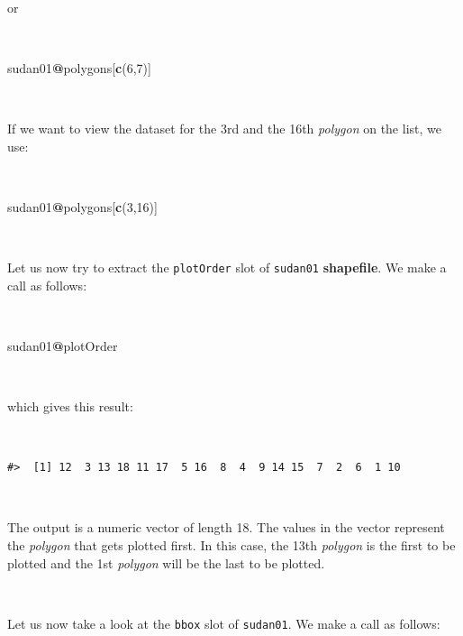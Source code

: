 \documentclass[12pt,a4paper,a4paper]{book}
\newenvironment{Shaded}{\begin{snugshade}}{\end{snugshade}}
\newcommand{\KeywordTok}[1]{\textcolor[rgb]{0.13,0.29,0.53}{\textbf{#1}}}
\newcommand{\DecValTok}[1]{\textcolor[rgb]{0.00,0.00,0.81}{#1}}
\newcommand{\OperatorTok}[1]{\textcolor[rgb]{0.81,0.36,0.00}{\textbf{#1}}}
\newcommand{\NormalTok}[1]{#1}
\theoremstyle{definition}
\theoremstyle{definition}
\theoremstyle{definition}
\theoremstyle{remark}
\begin{document}
~

or

~

\begin{Shaded}
\begin{Highlighting}[]
\NormalTok{sudan01}\OperatorTok{@}\NormalTok{polygons[}\KeywordTok{c}\NormalTok{(}\DecValTok{6}\NormalTok{,}\DecValTok{7}\NormalTok{)]}
\end{Highlighting}
\end{Shaded}

~

If we want to view the dataset for the 3rd and the 16th \emph{polygon}
on the list, we use:

~

\begin{Shaded}
\begin{Highlighting}[]
\NormalTok{sudan01}\OperatorTok{@}\NormalTok{polygons[}\KeywordTok{c}\NormalTok{(}\DecValTok{3}\NormalTok{,}\DecValTok{16}\NormalTok{)]}
\end{Highlighting}
\end{Shaded}

~

Let us now try to extract the \texttt{plotOrder} slot of
\texttt{sudan01} \textbf{shapefile}. We make a call as follows:

~

\begin{Shaded}
\begin{Highlighting}[]
\NormalTok{sudan01}\OperatorTok{@}\NormalTok{plotOrder}
\end{Highlighting}
\end{Shaded}

~

which gives this result:

~

\begin{verbatim}
#>  [1] 12  3 13 18 11 17  5 16  8  4  9 14 15  7  2  6  1 10
\end{verbatim}

~

The output is a numeric vector of length 18. The values in the vector
represent the \emph{polygon} that gets plotted first. In this case, the
13th \emph{polygon} is the first to be plotted and the 1st
\emph{polygon} will be the last to be plotted.

~

Let us now take a look at the \texttt{bbox} slot of \texttt{sudan01}. We
make a call as follows:
\end{document}
